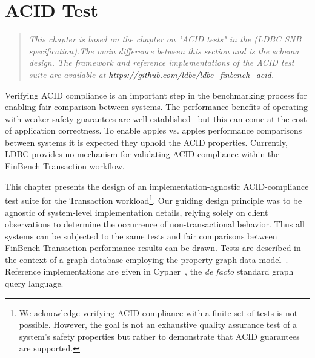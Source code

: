 \chapter{ACID Test}
\label{sec:acid-test}

\newcommand{\bl}[1]{\textcolor{blue}{#1}}
\newcommand{\rd}[1]{\textcolor{red}{#1}}
\newcommand{\gn}[1]{\textcolor{green}{#1}}
\newcommand{\gy}[1]{\textcolor{grey}{\textit{#1}}}

\newcommand{\level}[1]{\textsf{#1}}
\newcommand{\anomaly}[1]{\rd{#1}}
\newcommand{\anolong}[1]{\emph{\rd{#1}}}
\newcommand{\tx}[1]{#1}

\newcommand{\cmark}{\ding{51}}
\newcommand{\xmark}{\ding{55}}


\begin{quote}
  \textit{This chapter is based on the chapter on "ACID tests" in the 
          \ldbcsnb(LDBC SNB specification).The main difference between
          this section and \ldbcsnb\xspace is the schema design. The
          framework and reference implementations of the ACID test suite
          are available at \url{https://github.com/ldbc/ldbc_finbench_acid}.
  }
\end{quote}

Verifying ACID compliance is an important step in the benchmarking process for 
enabling fair comparison between systems. The performance benefits of operating
with weaker safety guarantees are well established~\cite{DBLP:conf/ds/GrayLPT76}
but this can come at the cost of application correctness. To enable apples vs. 
apples performance comparisons between systems it is expected they uphold the 
ACID properties. Currently, LDBC provides no mechanism for validating ACID 
compliance within the FinBench Transaction workflow.

This chapter presents the design of an implementation-agnostic ACID-compliance
test suite for the Transaction workload\footnote{We acknowledge verifying 
ACID compliance with a finite set of tests is not possible. However, the goal is
not an exhaustive quality assurance test of a system's safety properties but 
rather to demonstrate that ACID guarantees are supported.}. Our guiding design
principle was to be agnostic of system-level implementation details, relying 
solely on client observations to determine the occurrence of non-transactional 
behavior. Thus all systems can be subjected to the same tests and fair 
comparisons between FinBench Transaction performance results can be drawn. Tests
are described in the context of a graph database employing the property graph data 
model~\cite{DBLP:journals/csur/AnglesABHRV17}. Reference implementations are 
given in Cypher~\cite{DBLP:conf/sigmod/FrancisGGLLMPRS18}, the \emph{de facto} 
standard graph query language.

